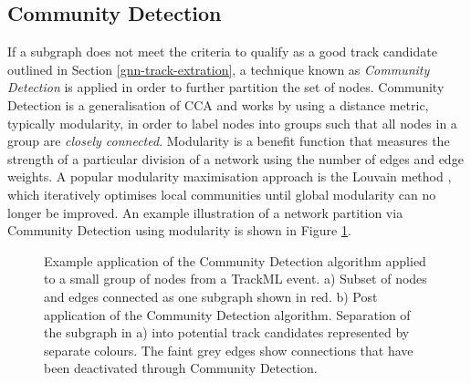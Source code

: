 \subsection{Community Detection}

If a subgraph does not meet the criteria to qualify as a good track candidate outlined in Section \ref{gnn-track-extration}, a technique known as \textit{Community Detection} \cite{community} is applied in order to further partition the set of nodes. Community Detection is a generalisation of CCA and works by using a distance metric, typically modularity, in order to label nodes into groups such that all nodes in a group are \textit{closely connected}. Modularity is a benefit function that measures the strength of a particular division of a network using the number of edges and edge weights. A popular modularity maximisation approach is the Louvain method \cite{python_louvain}, which iteratively optimises local communities until global modularity can no longer be improved. An example illustration of a network partition via Community Detection using modularity is shown in Figure \ref{fig:community-detection}. 

\begin{figure}[htbp!] 
    \centering
    \hfill%
    \caption{Example application of the Community Detection algorithm applied to a small group of nodes from a TrackML event. a) Subset of nodes and edges connected as one subgraph shown in red. b) Post application of the Community Detection algorithm. Separation of the subgraph in a) into potential track candidates represented by separate colours. The faint grey edges show connections that have been deactivated through Community Detection.}
    \label{fig:community-detection}
\end{figure}

